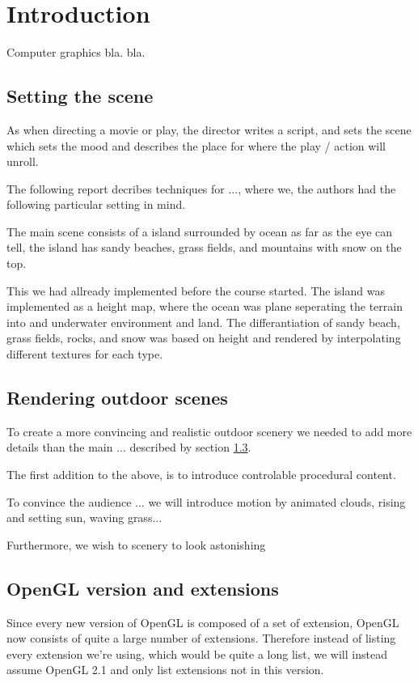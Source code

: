 
\chapter{Introduction}
Computer graphics bla. bla. 

\section{Setting the scene}
As when directing a movie or play, the director writes a script, and
sets the scene which sets the mood and describes the place for where
the play / action will unroll.

The following report decribes techniques for ..., where we, the
authors had the following particular setting in mind.

The main scene consists of a island surrounded by ocean as far as the
eye can tell, the island has sandy beaches, grass fields, and mountains
with snow on the top.

This we had allready implemented before the course started. The island
was implemented as a height map, where the ocean was plane seperating
the terrain into and underwater environment and land. The
differantiation of sandy beach, grass fields, rocks, and snow was
based on height and rendered by interpolating different textures for
each type.

\section{Rendering outdoor scenes}
To create a more convincing and realistic outdoor scenery we needed to
add more details than the main ... described by section \ref{}.

The first addition to the above, is to introduce controlable
procedural content.

To convince the audience ... we will introduce motion by animated
clouds, rising and setting sun, waving grass...


Furthermore, we wish to scenery to look astonishing



\section{OpenGL version and extensions}

Since every new version of OpenGL is composed of a set of extension,
OpenGL now consists of quite a large number of extensions. Therefore
instead of listing every extension we're using, which would be quite a
long list, we will instead assume OpenGL 2.1 and only list extensions
not in this version.

